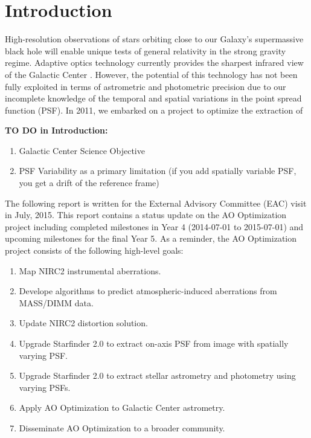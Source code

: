 \section{Introduction}

High-resolution observations of stars orbiting close to our Galaxy's supermassive black hole will enable unique tests of general relativity in the strong gravity regime. Adaptive optics technology currently provides the sharpest infrared view of the Galactic Center \cite{Ghez_2005}. However, the potential of this technology has not been fully exploited in terms of astrometric and photometric precision due to our incomplete knowledge of the temporal and spatial variations in the point spread function (PSF). In 2011, we embarked on a project to optimize the extraction of  

{\bf TO DO in Introduction:}
\begin{enumerate}
\item Galactic Center Science Objective
\item PSF Variability as a primary limitation (if you add spatially variable PSF, you get a drift of the reference frame)
\end{enumerate}


The following report is written for the External Advisory Committee (EAC) visit in July, 2015. This report contains a status update on the AO Optimization project including completed milestones in Year 4 (2014-07-01 to 2015-07-01) and upcoming milestones for the final Year 5. As a reminder, the AO Optimization project consists of the following high-level goals:
\begin{enumerate}
\item Map NIRC2 instrumental aberrations.
\item Develope algorithms to predict atmospheric-induced aberrations from MASS/DIMM data.
\item Update NIRC2 distortion solution.
\item Upgrade Starfinder 2.0 to extract on-axis PSF from image with spatially varying PSF.
\item Upgrade Starfinder 2.0 to extract stellar astrometry and photometry using varying PSFs.
\item Apply AO Optimization to Galactic Center astrometry.
\item Disseminate AO Optimization to a broader community.
\end{enumerate}




    
    
    
    
    
    
    
  